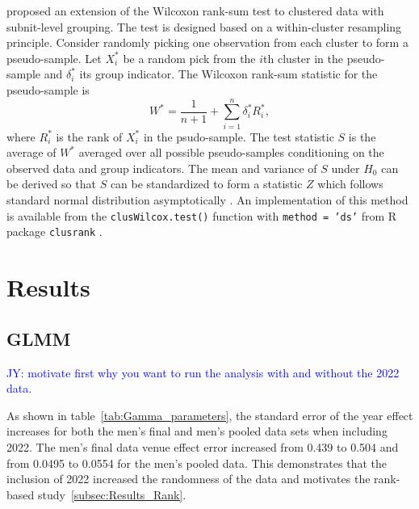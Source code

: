 \documentclass[12pt, letterpaper, titlepage]{article}
\newcommand{\jy}[1]{\textcolor{blue}{JY: #1}}
\begin{document}
\citet{datta2005rank} proposed an extension of the Wilcoxon rank-sum test to
clustered data with subnit-level grouping. The test is designed based on a
within-cluster resampling principle. Consider randomly picking one observation
from each cluster to form a pseudo-sample. Let $X_i^*$ be a random pick from the
$i$th cluster in the pseudo-sample and $\delta_i^*$ its group indicator. The
Wilcoxon rank-sum statistic for the pseudo-sample is
\[
W^* = \frac{1}{n + 1} + \sum_{i=1}^{n} \delta_{i}^{*} R_{i}^{*},
\]
where $R_{i}^{*}$ is the rank of $X_{i}^{*}$ in the psudo-sample.
The test statistic $S$ is the average of $W^*$ averaged over all possible
pseudo-samples conditioning on the observed data and group indicators.
The mean and variance of $S$ under $H_0$ can be derived so that $S$ can be
standardized to form a statistic $Z$ which follows standard normal distribution
asymptotically \citep[p.910]{datta2005rank}. An implementation of this method is
available from the \texttt{clusWilcox.test()} function with
\texttt{method = 'ds'} from R package \texttt{clusrank}
\citep{jiang2017wilcoxon}.


\section{Results} \label{sec:Results}

\subsection{GLMM} \label{subsec:Results_GLMM}

\jy{motivate first why you want to run the analysis with and without the 2022 data.}


As shown in table~\ref{tab:Gamma_parameters}, the standard error of the year
effect increases for both the men's final and men's pooled data sets when
including 2022.  The men's final data venue effect error increased from 0.439
to 0.504 and from 0.0495 to 0.0554 for the men's pooled data.  This demonstrates
that the inclusion of 2022 increased the randomness of the data and motivates
the rank-based study~\ref{subsec:Results_Rank}.
\end{document}
